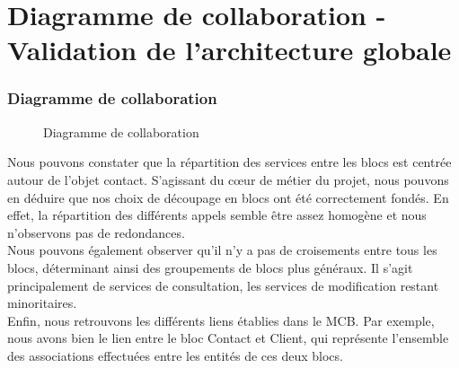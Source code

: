 \part{Diagramme de collaboration - Validation de l'architecture globale}
\setcounter{section}{0}

\section{Diagramme de collaboration}
\begin{figure}[H]
\noindent{}
\caption{Diagramme de collaboration}
\end{figure}

Nous pouvons constater que la répartition des services entre les blocs est centrée autour de l'objet contact. S'agissant du cœur de métier du projet, nous pouvons en déduire que nos choix de découpage en blocs ont été correctement fondés. En effet, la répartition des différents appels semble être assez homogène et nous n'observons pas de redondances. \\

Nous pouvons également observer qu'il n'y a pas de croisements entre tous les blocs, déterminant ainsi des groupements de blocs plus généraux. Il s'agit principalement de services de consultation, les services de modification restant minoritaires.\\

Enfin, nous retrouvons les différents liens établies dans le MCB. Par exemple, nous avons bien le lien entre le bloc Contact et Client, qui représente l'ensemble des associations effectuées entre les entités de ces deux blocs.



